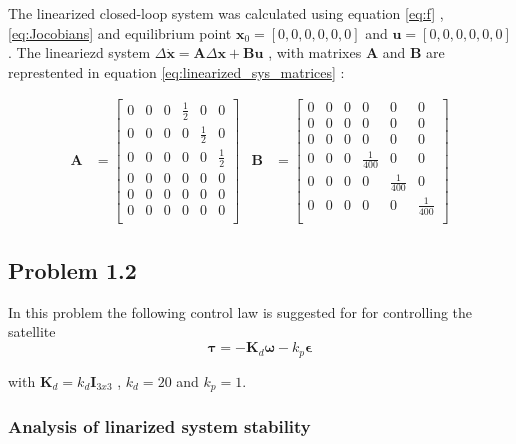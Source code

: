 The linearized  closed-loop system was calculated using equation \eqref{eq:f} , \eqref{eq:Jocobians} and equilibrium point $\mathbf{x}_0 = [0,0,0,0,0,0]$ and $\mathbf{u} = [0,0,0,0,0,0]$. The lineariezd system $\Delta \dot{\mathbf{x}} = \mathbf{A}\Delta \mathbf{x} + \mathbf{Bu}$ , with matrixes $\mathbf{A}$ and $\mathbf{B}$ are represtented in equation \eqref{eq:linearized_sys_matrices} :


\begin{equation}
    \begin{aligned}
	\mathbf{A}
	&=
	\begin{bmatrix}
		0 & 0 & 0 & \frac{1}{2} & 0   & 0\\
		0 & 0 & 0 & 0   & \frac{1}{2} & 0\\
		0 & 0 & 0 & 0   & 0   & \frac{1}{2}\\
		0 & 0 & 0 & 0 & 0 & 0\\
		0 & 0 & 0 & 0 & 0 & 0\\
		0 & 0 & 0 & 0 & 0 & 0\\
	\end{bmatrix}
	&
	\mathbf{B}& = 
	\begin{bmatrix}
		0 & 0 & 0 & 0 & 0 & 0\\
		0 & 0 & 0 & 0 & 0 & 0\\
		0 & 0 & 0 & 0 & 0 & 0\\
		0 & 0 & 0 & \frac{1}{400} & 0 & 0\\
		0 & 0 & 0 & 0 & \frac{1}{400} & 0\\
		0 & 0 & 0 & 0 & 0 & \frac{1}{400}\\
	\end{bmatrix}
	\end{aligned}
	\label{eq:linearized_sys_matrices}
\end{equation}


\subsection*{Problem 1.2}
In this problem the following control law is suggested for for controlling the satellite  
\begin{equation}
  \mathbf{\tau} = -\mathbf{K}_d \boldsymbol{\omega} - k_p \boldsymbol{\epsilon}
  \label{eq:control_1}
\end{equation}

with $\mathbf{K}_d = k_d \mathbf{I}_{3x3}$ , $k_d = 20$ and $k_p = 1$.  

\subsubsection*{Analysis of linarized system stability}

